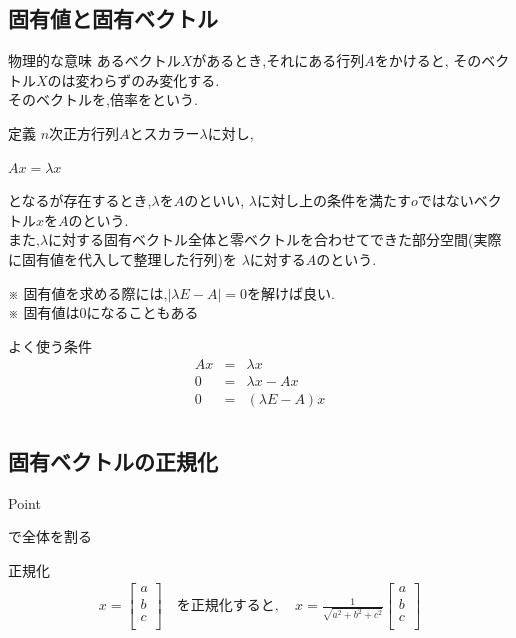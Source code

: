 \documentclass[a4paper]{jsarticle}
\begin{document}
\subsection{固有値と固有ベクトル}
\begin{itembox}[l]{物理的な意味}
    あるベクトル$X$があるとき,それにある行列$A$をかけると,
    そのベクトル$X$のは変わらずのみ変化する.\\
    そのベクトルを,倍率をという.
\end{itembox}
\begin{itembox}[l]{定義}
    $n$次正方行列$A$とスカラー$\lambda$に対し,
    \begin{center}
        $Ax=\lambda x$
    \end{center}
    となるが存在するとき,$\lambda$を$A$のといい,
    $\lambda$に対し上の条件を満たす$o$ではないベクトル$x$を$A$のという.\\
    また,$\lambda$に対する固有ベクトル全体と零ベクトルを合わせてできた部分空間(実際に固有値を代入して整理した行列)を
    $\lambda$に対する$A$のという.
\end{itembox}
※ 固有値を求める際には,$|\lambda E-A|=0$を解けば良い.\\
※ 固有値は$0$になることもある\\
\begin{itembox}[l]{よく使う条件}
    \begin{eqnarray*}
        Ax&=&\lambda x\\
        0&=&\lambda x-Ax\\
        0&=&\left(\lambda E -A\right)x\\
    \end{eqnarray*}
\end{itembox}
\subsection{固有ベクトルの正規化}
\begin{itembox}[l]{Point}
    \begin{center}
        で全体を割る
    \end{center}
\end{itembox}
\begin{itembox}[l]{正規化}
    \begin{eqnarray*}
        x=
        \begin{bmatrix}
            a \\
            b \\
            c \\
        \end{bmatrix}
        \quad を正規化すると,\quad
        x=
        \frac{1}{\sqrt{a^2+b^2+c^2}}
        \begin{bmatrix}
            a \\
            b \\
            c \\
        \end{bmatrix}\\
    \end{eqnarray*}
\end{itembox}
\end{document}
